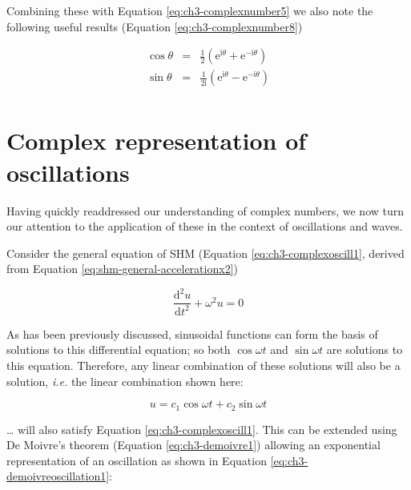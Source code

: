 \documentclass[
]{book}
\begin{document}
Combining these with Equation \eqref{eq:ch3-complexnumber5} we also note the following useful results (Equation \eqref{eq:ch3-complexnumber8})

\begin{equation}
\begin{array}{rcl}
\cos \theta &=& \frac{1}{2} \left( \mathrm{e}^{\mathrm{i}\theta} + \mathrm{e}^{-\mathrm{i}\theta} \right)\\
\sin \theta &=& \frac{1}{2\mathrm{i}} \left( \mathrm{e}^{\mathrm{i}\theta} - \mathrm{e}^{-\mathrm{i}\theta} \right)\\
\end{array}
\label{eq:ch3-complexnumber8}
\end{equation}

\hypertarget{sec-ch3-complexreposcillation}{%
\section{Complex representation of oscillations}\label{sec-ch3-complexreposcillation}}

Having quickly readdressed our understanding of complex numbers, we now turn our attention to the application of these in the context of oscillations and waves.

Consider the general equation of SHM (Equation \eqref{eq:ch3-complexoscill1}, derived from Equation \eqref{eq:shm-general-accelerationx2})

\begin{equation}
\frac{\mathrm{d}^2 u}{\mathrm{d} t^2 } + \omega^2 u = 0
\label{eq:ch3-complexoscill1}
\end{equation}

As has been previously discussed, sinusoidal functions can form the basis of solutions to this differential equation; so both \(\cos \omega t\) and \(\sin \omega t\) are solutions to this equation. Therefore, any linear combination of these solutions will also be a solution, \emph{i.e.} the linear combination shown here:

\begin{equation}
u = c_1 \cos \omega t + c_2 \sin \omega t
\end{equation}

\ldots{} will also satisfy Equation \eqref{eq:ch3-complexoscill1}. This can be extended using De Moivre's theorem (Equation \eqref{eq:ch3-demoivre1}) allowing an exponential representation of an oscillation as shown in Equation \eqref{eq:ch3-demoivreoscillation1}:
\end{document}

